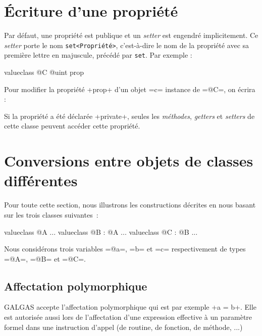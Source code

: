 \section{Écriture d'une propriété}

Par défaut, une propriété est publique et un \emph{setter} est engendré implicitement. Ce \emph{setter} porte le nom \texttt{set<Propriété>}, c'est-à-dire le nom de la propriété avec sa première lettre en majuscule, précédé par \texttt{set}. Par exemple :

\begin{galgas3}
valueclass @C {
  @uint prop
}
\end{galgas3}


Pour modifier la propriété \ggst+prop+ d'un objet \ggst=c= instance de \ggst=@C=, on écrira :

\begin{galgas3}
[!?c setProp !12]
\end{galgas3}

Si la propriété a été déclarée \ggst+private+, seules les \emph{méthodes}, \emph{getters} et \emph{setters} de cette classe peuvent accéder cette propriété.












\section{Conversions entre objets de classes différentes}

Pour toute cette section, nous illustrons les constructions décrites en nous basant sur les trois classes suivantes~:
\begin{galgas3}
valueclass @A {
  ...
}
valueclass @B : @A {
  ...
}
valueclass @C : @B {
  ...
}
\end{galgas3}

Nous considérons trois variables \ggst=@a=, \ggst=b= et \ggst=c= respectivement de types \ggst=@A=, \ggst=@B= et \ggst=@C=.


\subsection{Affectation polymorphique}

GALGAS accepte l'affectation polymorphique qui est par exemple \ggst+a = b+. Elle est autorisée aussi lors de l'affectation d'une expression effective à un paramètre formel dans une instruction d'appel (de routine, de fonction, de méthode, ...)


